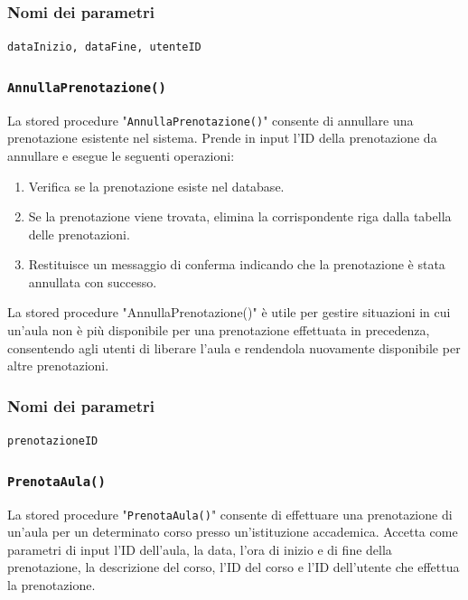 \documentclass[a4paper, 10pt, oneside]{article} %
\begin{document}
\subsubsection*{Nomi dei parametri}

\texttt{dataInizio, dataFine, utenteID}


\subsubsection*{\texttt{AnnullaPrenotazione()}}

La stored procedure "\texttt{AnnullaPrenotazione()}" consente di annullare una prenotazione esistente nel sistema. Prende in input l'ID della prenotazione da annullare e esegue le seguenti operazioni:

\begin{enumerate}
    \item Verifica se la prenotazione esiste nel database.
    \item Se la prenotazione viene trovata, elimina la corrispondente riga dalla tabella delle prenotazioni.
    \item Restituisce un messaggio di conferma indicando che la prenotazione è stata annullata con successo.

\end{enumerate}

La stored procedure "AnnullaPrenotazione()" è utile per gestire situazioni in cui un'aula non è più disponibile per una prenotazione effettuata in precedenza, consentendo agli utenti di liberare l'aula e rendendola nuovamente disponibile per altre prenotazioni.


\subsubsection*{Nomi dei parametri}

\texttt{prenotazioneID}

\subsubsection*{\texttt{PrenotaAula()}}

La stored procedure "\texttt{PrenotaAula()}" consente di effettuare una prenotazione di un'aula per un determinato corso presso un'istituzione accademica. Accetta come parametri di input l'ID dell'aula, la data, l'ora di inizio e di fine della prenotazione, la descrizione del corso, l'ID del corso e l'ID dell'utente che effettua la prenotazione.\\
\end{document}
